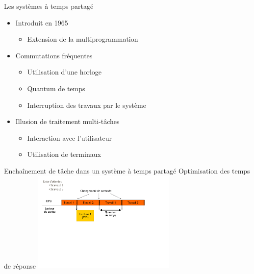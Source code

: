 \begin{frame}{Les systèmes à temps partagé}
\begin{itemize}
\item Introduit en 1965
\begin{itemize}
\item Extension de la multiprogrammation
\end{itemize}
\item Commutations fréquentes
\begin{itemize}
\item Utilisation d’une horloge
\item Quantum de temps
\item Interruption des travaux par le système
\end{itemize}
\item Illusion de traitement multi-tâches
\begin{itemize}
\item Interaction avec l'utilisateur
\item Utilisation de terminaux
\end{itemize}
\end{itemize}
\end{frame}

\begin{frame}{Enchaînement de tâche dans un système à temps partagé}
Optimisation des temps de réponse
\includegraphics[height=5cm]{../illustration/systeme_tps_partage_enchainement.pdf}
\end{frame}

